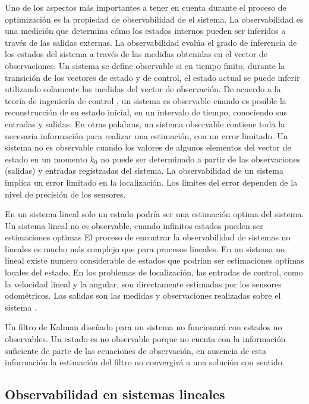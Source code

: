 Uno de los aspectos más importantes a tener en cuenta durante el proceso de optimización es la propiedad de observabilidad de el sistema.
La observabilidad es una medición que determina cómo los estados internos pueden ser inferidos a través de las salidas externas.
La observabilidad evalúa el grado de inferencia de los estados del sistema a través de las medidas obtenidas en el vector de observaciones.
Un sistema se define observable si en tiempo finito, durante la transición de los vectores de estado y de control, el estado actual se puede inferir utilizando solamente las medidas del vector de observación.
De acuerdo a la teoría de ingeniería de control \cite{Ogata2010}, un sistema es observable cuando es posible la reconstrucción de su estado inicial, en un intervalo de tiempo, conociendo sus entradas y salidas.
En otras palabras, un sistema observable contiene toda la necesaria información para realizar una estimación, con un error limitado.
Un sistema no es observable cuando los valores de algunos elementos del vector de estado en un momento $k_0$ no puede ser determinado a partir
de las observaciones (salidas) y entradas registradas del sistema.
La observabilidad de un sistema implica un error limitado en la localización.
Los limites del error dependen de la nivel de precisión de los sensores. \par
En un sistema lineal solo un estado podría ser una estimación optima del sistema.
Un sistema lineal no es observable, cuando infinitos estados pueden ser estimaciones optimas
El  proceso de encontrar la observabilidad de sistemas no lineales es mucho más complejo que para procesos lineales.
En un sistema no lineal existe numero considerable de estados que podrían ser estimaciones optimas locales del estado.
En los problemas de localización, las entradas de control, como la velocidad lineal y la angular, son directamente estimadas por los sensores odométricos.
Las salidas son las medidas y observaciones realizadas sobre el sistema \cite{Hermann1977}.\par
Un filtro de Kalman diseñado para un sistema no funcionará con estados no observables.
Un estado es no observable porque no cuenta con la información suficiente de parte de las ecuaciones de observación, en ausencia de esta información la estimación del filtro no convergirá a una solución con sentido.

\subsection{Observabilidad en sistemas lineales}
\label{subsec:linealobs}

